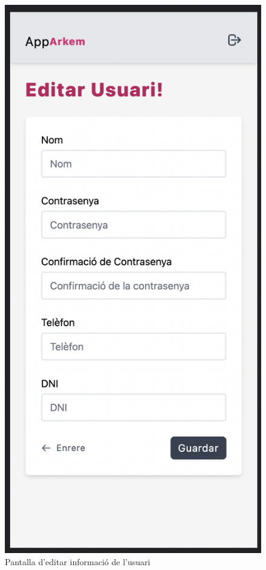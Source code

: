 \begin{figure}[H]
    \begin{center}
        \includegraphics[scale=0.50]{Fotos/pantalla9_edit_user.png}
    \end{center}
    \caption{Pantalla d'editar informació de l'usuari}
    \label{fig:edit_user_photo}
\end{figure}

